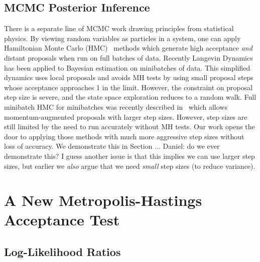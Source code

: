 \documentclass{article}
\begin{document}
\subsection{MCMC Posterior Inference}
There is a separate line of MCMC work drawing principles from statistical
physics. By viewing random variables as particles in a system, one can apply
Hamiltonian Monte Carlo (HMC)~\cite{mcmc_hamiltonian_2010} methods which
generate high acceptance \emph{and} distant proposals when run on full batches
of data. Recently Langevin Dynamics~\cite{langevin_2011,conf/icml/AhnBW12} has
been applied to Bayesian estimation on minibatches of data. This simplified
dynamics uses local proposals and avoids MH tests by using small proposal steps
whose acceptance approaches 1 in the limit. However, the constraint on proposal
step size is severe, and the state space exploration reduces to a random walk.
Full minibatch HMC for minibatches was recently described in~\cite{sghmc_2014}
which allows momentum-augmented proposals with larger step sizes. However, step
sizes are still limited by the need to run accurately without MH tests.  Our
work opens the door to applying those methods with much more aggressive step
sizes without loss of accuracy. We demonstrate this in Section ... {\color{blue}
Daniel: do we ever demonstrate this? I guess another issue is that this implies
we can use larger step sizes, but earlier we \emph{also} argue that we need
\emph{small} step sizes (to reduce variance).}




\section{A New Metropolis-Hastings Acceptance Test}\label{sec:our_algorithm}

\subsection{Log-Likelihood Ratios}\label{ssec:log_likelihood_ratios}
\end{document}
